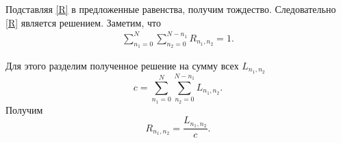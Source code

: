 Подставляя  \eqref{R} в предложенные равенства, получим тождество. Следовательно  \eqref{R} является решением.
Заметим, что\\
\begin{align*}
	\sum_{n_{1}=0}^{N}\sum_{n_{2}=0}^{N-n_{1}}R_{n_{1},n_{2}}=1.
\end{align*}

Для этого разделим полученное решение на сумму всех $L_{n_{1}, n_{2}}$\\
\begin{equation*}
		c=\sum_{n_1=0}^N\sum_{n_2=0}^{N-n_1} L_{n_{1}, n_{2}}.
\end{equation*}
Получим 
\begin{equation*}
	R_{n_{1}, n_{2}}=\frac{L_{n_{1}, n_{2}}}{c}.
\end{equation*}
